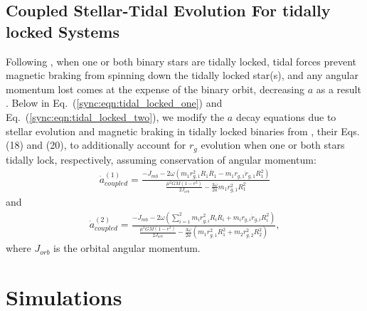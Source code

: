 \subsection{Coupled Stellar-Tidal Evolution For tidally locked Systems} \label{sync:sec:coupled}

Following \citet{Fleming2018}, when one or both binary stars are tidally locked, tidal forces prevent magnetic braking from spinning down the tidally locked star(s), and any angular momentum lost comes at the expense of the binary orbit, decreasing $a$ as a result \citep{Verbunt1981}.  Below in Eq.~(\ref{sync:eqn:tidal_locked_one}) and Eq.~(\ref{sync:eqn:tidal_locked_two}), we modify the $a$ decay equations due to stellar evolution and magnetic braking in tidally locked binaries from \citet{Fleming2018}, their Eqs. (18) and (20), to additionally account for $r_g$ evolution when one or both stars tidally lock, respectively, assuming conservation of angular momentum:
\small
\begin{equation} \label{sync:eqn:tidal_locked_one}
\begin{split}
\dot{a}_{coupled}^{(1)} = \frac{-\dot{J}_{mb} - 2 \omega \left( m_1 r_{g,1}^2 R_1 \dot{R_1} - m_1 r_{g,1} \dot{r}_{g,1} R_1^2 \right)}
{\frac{\mu^2 G M (1-e^2)}{2J_{orb}} - \frac{3 \omega}{2a} m_1 r_{g,1}^2 R_1^2}
\end{split}
\end{equation}
\normalsize
and
\small
\begin{equation} \label{sync:eqn:tidal_locked_two}
\begin{split}
\dot{a}_{coupled}^{(2)} = \frac{-\dot{J}_{mb} - 2 \omega \left( \sum_{i=1}^{2} m_i r_{g,i}^2 R_i \dot{R_i} + m_i r_{g,i} \dot{r}_{g,i} R_i^2 \right)}
{\frac{\mu^2 G M (1-e^2)}{2J_{orb}} - \frac{3 \omega}{2a} \left( m_1 r_{g,1}^2 R_1^2 + m_2 r_{g,2}^2 R_2^2 \right)},
\end{split}
\end{equation}
\normalsize
where $J_{orb}$ is the orbital angular momentum.

\section{Simulations} \label{sync:sec:simulations}

